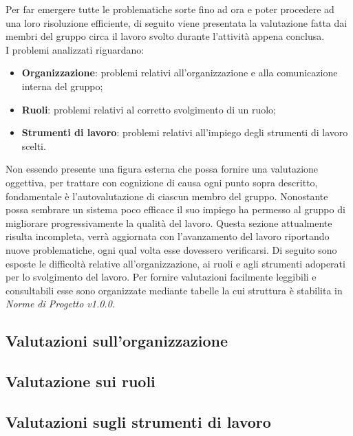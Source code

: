 Per far emergere tutte le problematiche sorte fino ad ora e poter procedere 
ad una loro risoluzione efficiente, di seguito viene presentata la valutazione 
fatta dai membri del gruppo {\Gruppo} circa il lavoro svolto durante l’attività appena conclusa. \\
I problemi analizzati riguardano:

\begin{itemize}
	\item \textbf{Organizzazione}: problemi relativi all’organizzazione e alla comunicazione interna del gruppo;
	\item \textbf{Ruoli}: problemi relativi al corretto svolgimento di un ruolo;
	\item \textbf{Strumenti di lavoro}: problemi relativi all’impiego degli strumenti di lavoro scelti.
\end{itemize}

Non essendo presente una figura esterna che possa fornire una valutazione oggettiva, per trattare con cognizione 
di causa ogni punto sopra descritto, fondamentale è l’autovalutazione di ciascun membro del gruppo. Nonostante possa 
sembrare un sistema poco efficace il suo impiego ha permesso al gruppo di migliorare progressivamente la qualità del lavoro. 
Questa sezione attualmente risulta incompleta, verrà aggiornata con l’avanzamento del lavoro riportando nuove problematiche, 
ogni qual volta esse dovessero verificarsi. Di seguito sono esposte le difficoltà relative all’organizzazione, ai ruoli e agli strumenti 
adoperati per lo svolgimento del lavoro. Per fornire valutazioni facilmente leggibili e consultabili esse sono organizzate mediante tabelle 
la cui struttura è stabilita in \textit{Norme di Progetto v1.0.0}. 

\subsection{Valutazioni sull'organizzazione}

\newpage
\subsection{Valutazione sui ruoli}


\subsection{Valutazioni sugli strumenti di lavoro}
